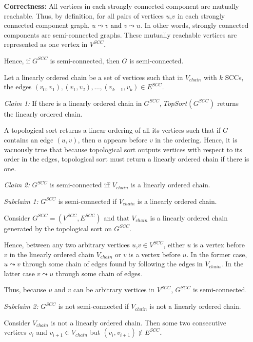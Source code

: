 \documentclass[a4paper]{report}
\begin{document}
\begin{enumerate}
      {\bf Correctness:}
      All vertices in each strongly connected component are mutually reachable. 
      Thus, by definition, for all pairs of vertices $u$,$v$ in each strongly connected component graph, $u \leadsto v$ and $v \leadsto u$. 
      In other words, strongly connected components are semi-connected graphs. 
      These mutually reachable vertices are represented as one vertex in $V^{SCC}$. 

      Hence, if $G^{SCC}$ is semi-connected, then $G$ is semi-connected. 
      
      Let a linearly ordered chain be a set of vertices such that in $V_{chain}$ with $k$ SCCs, the
      edges $(v_{0}, v_{1}), (v_{1},v_{2}),\dots,(v_{k-1},v_{k}) \in E^{SCC}$.

      {\it Claim 1:} If there is a linearly ordered chain in $G^{SCC}$, $TopSort(G^{SCC})$ returns the linearly ordered chain. 

      A topological sort returns a linear ordering of all its vertices such that if $G$ contains an edge $(u,v)$, then $u$
      appears before $v$ in the ordering. Hence, it is vacuously true that because topological sort outputs vertices with respect 
      to its order in the edges, topological sort must return a linearly ordered chain if there is one. 

      {\it Claim 2:} $G^{SCC}$ is semi-connected iff $V_{chain}$ is a linearly ordered chain. 

      {\it Subclaim 1:} $G^{SCC}$ is semi-connected if $V_{chain}$ is a linearly ordered chain. 

      Consider $G^{SCC}=(V^{SCC}, E^{SCC})$ and that $V_{chain}$ is a linearly ordered chain generated by the topological sort on $G^{SCC}$. 

      Hence, between any two arbitrary vertices $u$,$v \in V^{SCC}$, either $u$ is a vertex before $v$ in the linearly ordered chain $V_{chain}$ or
      $v$ is a vertex before $u$. In the former case, $u \leadsto v$ through some chain of edges found by following the edges in 
      $V_{chain}$. In the latter case $v \leadsto u$ through some chain of edges. 

      Thus, because $u$ and $v$ can be arbitrary vertices in $V^{SCC}$, $G^{SCC}$ is semi-connected. 


      {\it Subclaim 2:} $G^{SCC}$ is not semi-connected if $V_{chain}$ is not a linearly ordered chain. 

      Consider $V_{chain}$ is not a linearly ordered chain. Then some two consecutive vertices $v_{i}$ and 
      $v_{i+1} \in V_{chain}$ but $(v_{i}, v_{i+1}) \not\in E^{SCC}$. 


\end{enumerate}
\end{document}
